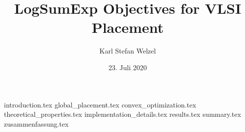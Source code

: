 \documentclass[a4paper, 12pt, twoside, BCOR=11mm, egregdoesnotlikesansseriftitles]{scrbook}
\author{Karl Stefan Welzel}
\date{23. Juli 2020}
\title{LogSumExp Objectives for VLSI Placement}
\begin{document}
 \hypersetup{pageanchor=false}
 \maketitle
 \hypersetup{pageanchor=true}
 
 \frontmatter
 \tableofcontents{}

 
 \mainmatter
 {introduction.tex}
 {global_placement.tex}
 {convex_optimization.tex}
 {theoretical_properties.tex}
 {implementation_details.tex}
 {results.tex}
 {summary.tex}
 {zusammenfassung.tex}

 \backmatter
 \printbibliography[heading=bibintoc]
\end{document}
